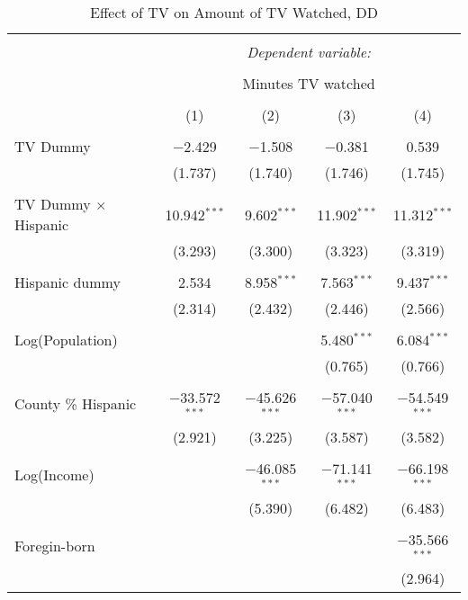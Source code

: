 
\begin{table}[!htbp] \centering 
  \caption{Effect of TV on Amount of TV Watched, DD} 
  \label{} 
\begin{tabular}{@{\extracolsep{-5pt}}lcccc} 
\\[-1.8ex]\hline 
\hline \\[-1.8ex] 
 & \multicolumn{4}{c}{\textit{Dependent variable:}} \\ 
\cline{2-5} 
\\[-1.8ex] & \multicolumn{4}{c}{Minutes TV watched} \\ 
\\[-1.8ex] & (1) & (2) & (3) & (4)\\ 
\hline \\[-1.8ex] 
 TV Dummy & $-$2.429 & $-$1.508 & $-$0.381 & 0.539 \\ 
  & (1.737) & (1.740) & (1.746) & (1.745) \\ 
  & & & & \\ 
 TV Dummy $\times$ Hispanic  & 10.942$^{***}$ & 9.602$^{***}$ & 11.902$^{***}$ & 11.312$^{***}$ \\ 
  & (3.293) & (3.300) & (3.323) & (3.319) \\ 
  & & & & \\ 
 Hispanic dummy & 2.534 & 8.958$^{***}$ & 7.563$^{***}$ & 9.437$^{***}$ \\ 
  & (2.314) & (2.432) & (2.446) & (2.566) \\ 
  & & & & \\ 
 Log(Population) &  &  & 5.480$^{***}$ & 6.084$^{***}$ \\ 
  &  &  & (0.765) & (0.766) \\ 
  & & & & \\ 
 County \% Hispanic & $-$33.572$^{***}$ & $-$45.626$^{***}$ & $-$57.040$^{***}$ & $-$54.549$^{***}$ \\ 
  & (2.921) & (3.225) & (3.587) & (3.582) \\ 
  & & & & \\ 
 Log(Income) &  & $-$46.085$^{***}$ & $-$71.141$^{***}$ & $-$66.198$^{***}$ \\ 
  &  & (5.390) & (6.482) & (6.483) \\ 
  & & & & \\ 
 Foregin-born &  &  &  & $-$35.566$^{***}$ \\ 
  &  &  &  & (2.964) \\ 

\end{tabular}
\end{table}
